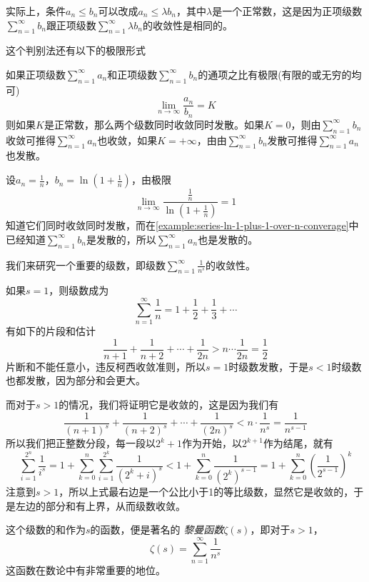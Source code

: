 实际上，条件$a_n \leqslant b_n$可以改成$a_n \leqslant \lambda b_n$，其中$\lambda$是一个正常数，这是因为正项级数$\sum_{n=1}^{\infty}b_n$跟正项级数$\sum_{n=1}^{\infty}\lambda b_n$的收敛性是相同的。

这个判别法还有以下的极限形式
\begin{theorem}
  如果正项级数$\sum_{n=1}^{\infty}a_n$和正项级数$\sum_{n=1}^{\infty}b_n$的通项之比有极限(有限的或无穷的均可)
  \[ \lim_{n \to \infty} \frac{a_n}{b_n} = K \]
  则如果$K$是正常数，那么两个级数同时收敛同时发散。如果$K=0$，则由$\sum_{n=1}^{\infty}b_n$收敛可推得$\sum_{n=1}^{\infty}a_n$也收敛，如果$K=+\infty$，由由$\sum_{n=1}^{\infty}b_n$发散可推得$\sum_{n=1}^{\infty}a_n$也发散。
\end{theorem}

\begin{example}
  设$a_n=\frac{1}{n}$，$b_n=\ln{\left( 1+\frac{1}{n} \right)}$，由极限
  \[ \lim_{n \to \infty} \frac{\frac{1}{n}}{\ln{\left( 1+\frac{1}{n} \right)}} =1 \]
  知道它们同时收敛同时发散，而在\autoref{example:series-ln-1-plus-1-over-n-converage}中已经知道$\sum_{n=1}^{\infty}b_n$是发散的，所以$\sum_{n=1}^{\infty}a_n$也是发散的。
\end{example}


\begin{example}
  我们来研究一个重要的级数，即级数$\sum_{n=1}^{\infty}\frac{1}{n^s}$的收敛性。

  如果$s=1$，则级数成为
  \[ \sum_{n=1}^{\infty}\frac{1}{n} = 1+\frac{1}{2} + \frac{1}{3} + \cdots \]
  有如下的片段和估计
  \[ \frac{1}{n+1} + \frac{1}{n+2} + \cdots + \frac{1}{2n} > n \cdots \frac{1}{2n} = \frac{1}{2} \]
  片断和不能任意小，违反柯西收敛准则，所以$s=1$时级数发散，于是$s<1$时级数也都发散，因为部分和会更大。

  而对于$s>1$的情况，我们将证明它是收敛的，这是因为我们有
  \[ \frac{1}{(n+1)^s} + \frac{1}{(n+2)^s} + \cdots + \frac{1}{(2n)^s} < n \cdot \frac{1}{n^s} = \frac{1}{n^{s-1}} \]
  所以我们把正整数分段，每一段以$2^k+1$作为开始，以$2^{k+1}$作为结尾，就有
  \[ \sum_{i=1}^{2^n}\frac{1}{i^s} = 1+\sum_{k=0}^n \sum_{i=1}^{2^k} \frac{1}{(2^k+i)^s} < 1+\sum_{k=0}^n \frac{1}{(2^k)^{s-1}} =  1+\sum_{k=0}^n \left( \frac{1}{2^{s-1}} \right)^k \]
  注意到$s>1$，所以上式最右边是一个公比小于1的等比级数，显然它是收敛的，于是左边的部分和有上界，从而级数收敛。

  这个级数的和作为$s$的函数，便是著名的 \emph{黎曼函数}$\zeta(s)$，即对于$s>1$，
  \[ \zeta (s) = \sum_{n=1}^{\infty} \frac{1}{n^s} \]
  这函数在数论中有非常重要的地位。
\end{example}



